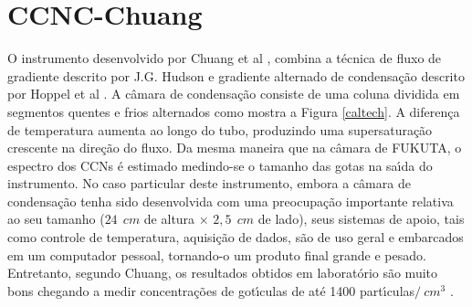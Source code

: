 
\section{CCNC-Chuang}

O instrumento desenvolvido por Chuang et al \cite{chuang}, combina a t\'{e}cnica de fluxo de gradiente descrito por J.G. Hudson \cite{Hudson} e gradiente alternado de condensa\c{c}\~{a}o descrito por Hoppel et al \cite{Hoppel}. A c\^{a}mara de condensa\c{c}\~{a}o consiste de uma coluna dividida em segmentos quentes e frios alternados  como mostra a Figura \ref{caltech}. A diferen\c{c}a de temperatura aumenta ao longo do tubo, produzindo uma
supersatura\c{c}\~{a}o crescente na dire\c{c}\~{a}o do fluxo. Da mesma maneira que na c\^{a}mara de FUKUTA, o
espectro dos CCNs \'{e} estimado medindo-se o tamanho das gotas na sa\'{\i}da do instrumento.
No caso particular deste instrumento, embora a c\^{a}mara de condensa\c{c}\~{a}o tenha sido desenvolvida com uma preocupa\c{c}\~{a}o importante relativa ao seu tamanho ($24\ \ cm$ de altura $\times$ $2,5\ \ cm$ de lado), seus sistemas de apoio, tais como  controle de temperatura, aquisi\c{c}\~{a}o de dados, s\~{a}o de uso geral e embarcados em um computador pessoal,  tornando-o um produto final grande e pesado. Entretanto, segundo Chuang, os resultados obtidos em laborat\'{o}rio s\~{a}o muito bons chegando a medir concentra\c{c}\~{o}es de got\'{\i}culas de at\'{e} 1400 part\'{\i}culas$ /\ cm^3$ \cite{chuang}.

